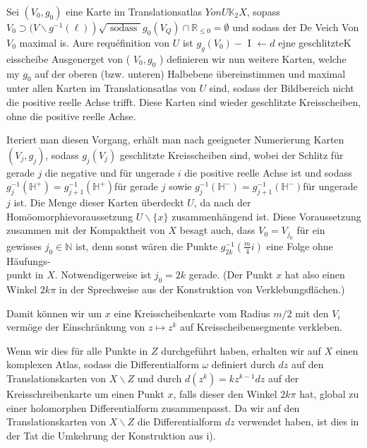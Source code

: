 \documentclass[10pt, letterpaper]{article}
\begin{document}
Sei $\left(V_{0}, g_{0}\right)$ eine Karte im Translationsatlas $Y o n U \mathbb{K}_{2} X$, sopass $V_{0} \supset(V \backslash \left.g^{-1}(\ell)\right) \sqrt{\text { sodass }} g_{0}\left(V_{Q}\right) \cap \mathbb{R}_{\leq 0}=\emptyset$ und sodass der De Veich Von $V_{0}$ maximal is. Aure requéfinition von $U$ ist $g_{g}\left(V_{0}\right)-$ I $\leftarrow d$ ejne geschlitzteK eisscheibe Ausgenerget von ( $V_{0}, g_{0}$ ) definieren wir nun weitere Karten, welche my $g_{0}$ auf der oberen (bzw. unteren) Halbebene übereinstimmen und maximal unter allen Karten im Translationsatlas von $U$ sind, sodass der Bildbereich nicht die positive reelle Achse trifft. Diese Karten sind wieder geschlitzte Kreisscheiben, ohne die positive reelle Achse.

Iteriert man diesen Vorgang, erhält man nach geeigneter Numerierung Karten $\left(V_{j}, g_{j}\right)$, sodass $g_{j}\left(V_{j}\right)$ geschlitzte Kreisscheiben sind, wobei der Schlitz für gerade $j$ die negative und für ungerade $i$ die positive reelle Achse ist und sodass $g_{j}^{-1}\left(\mathbb{H}^{+}\right)=g_{j+1}^{-1}\left(\mathbb{H}^{+}\right)$für gerade $j$ sowie $g_{j}^{-1}\left(\mathbb{H}^{-}\right)=g_{j+1}^{-1}\left(\mathbb{H}^{-}\right)$für ungerade $j$ ist. Die Menge dieser Karten überdeckt $U$, da nach der Homöomorphievoraussetzung $U \backslash\{x\}$ zusammenhängend ist. Diese Voraussetzung zusammen mit der Kompaktheit von $X$ besagt auch, dass $V_{0}=V_{j_{0}}$ für ein gewisses $j_{0} \in \mathbb{N}$ ist, denn sonst wären die Punkte $g_{2 k}^{-1}\left(\frac{m}{4} i\right)$ eine Folge ohne Häufungs-\\
punkt in $X$. Notwendigerweise ist $j_{0}=2 k$ gerade. (Der Punkt $x$ hat also einen Winkel $2 k \pi$ in der Sprechweise aus der Konstruktion von Verklebungsflächen.)

Damit können wir um $x$ eine Kreisscheibenkarte vom Radius $m / 2$ mit den $V_{i}$ vermöge der Einschränkung von $z \mapsto z^{k}$ auf Kreisscheibensegmente verkleben.

Wenn wir dies für alle Punkte in $Z$ durchgeführt haben, erhalten wir auf $X$ einen komplexen Atlas, sodass die Differentialform $\omega$ definiert durch $d z$ auf den Translationskarten von $X \backslash Z$ und durch $d\left(z^{k}\right)=k z^{k-1} d z$ auf der Kreisschreibenkarte um einen Punkt $x$, falls dieser den Winkel $2 k \pi$ hat, global zu einer holomorphen Differentialform zusammenpasst. Da wir auf den Translationskarten von $X \backslash Z$ die Differentialform $d z$ verwendet haben, ist dies in der Tat die Umkehrung der Konstruktion aus i).
\end{document}
